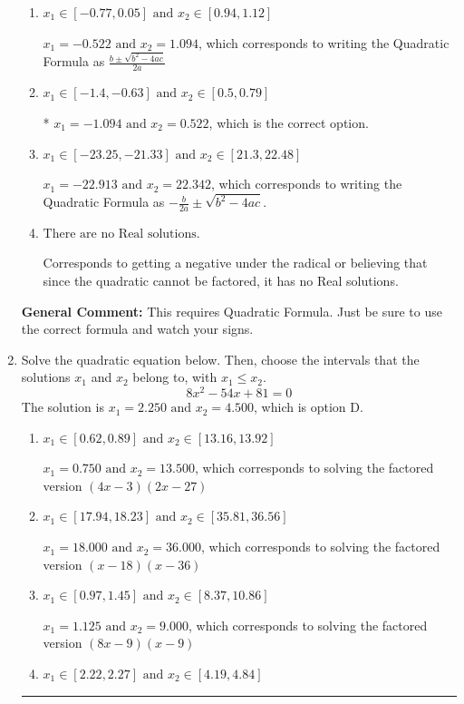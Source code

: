 \documentclass{extbook}[14pt]
\newcommand{\litem}[1]{\item #1

\rule{\textwidth}{0.4pt}}
\begin{document}
\begin{enumerate}
{\begin{enumerate}[label=\Alph*.]
 $x_1 = -15.314 \text{ and } x_2 = 7.314$, which corresponds to using the Quadratic Formula with $a=1$
\item \( x_1 \in [-0.77, 0.05] \text{ and } x_2 \in [0.94, 1.12] \)

 $x_1 = -0.522 \text{ and } x_2 = 1.094$, which corresponds to writing the Quadratic Formula as $\frac{b \pm \sqrt{b^2 - 4ac}}{2a}$
\item \( x_1 \in [-1.4, -0.63] \text{ and } x_2 \in [0.5, 0.79] \)

* $x_1 = -1.094 \text{ and } x_2 = 0.522$, which is the correct option.
\item \( x_1 \in [-23.25, -21.33] \text{ and } x_2 \in [21.3, 22.48] \)

 $x_1 = -22.913 \text{ and } x_2 = 22.342$, which corresponds to writing the Quadratic Formula as $-\frac{b}{2a} \pm \sqrt{b^2 - 4ac}$.
\item \( \text{There are no Real solutions.} \)

Corresponds to getting a negative under the radical or believing that since the quadratic cannot be factored, it has no Real solutions.
\end{enumerate}

\textbf{General Comment:} This requires Quadratic Formula. Just be sure to use the correct formula and watch your signs.
}
\litem{
Solve the quadratic equation below. Then, choose the intervals that the solutions $x_1$ and $x_2$ belong to, with $x_1 \leq x_2$.
\[ 8x^{2} -54 x + 81 = 0 \]The solution is \( x_1 = 2.250 \text{ and } x_2 = 4.500 \), which is option D.\begin{enumerate}[label=\Alph*.]
\item \( x_1 \in [0.62, 0.89] \text{ and } x_2 \in [13.16, 13.92] \)

$x_1 = 0.750 \text{ and } x_2 = 13.500$, which corresponds to solving the factored version $(4x -3)(2x -27)$
\item \( x_1 \in [17.94, 18.23] \text{ and } x_2 \in [35.81, 36.56] \)

$x_1 = 18.000 \text{ and } x_2 = 36.000$, which corresponds to solving the factored version $(x -18)(x -36)$
\item \( x_1 \in [0.97, 1.45] \text{ and } x_2 \in [8.37, 10.86] \)

$x_1 = 1.125 \text{ and } x_2 = 9.000$, which corresponds to solving the factored version $(8x -9)(x -9)$
\item \( x_1 \in [2.22, 2.27] \text{ and } x_2 \in [4.19, 4.84] \)


\end{enumerate}}
\end{enumerate}
\end{document}
